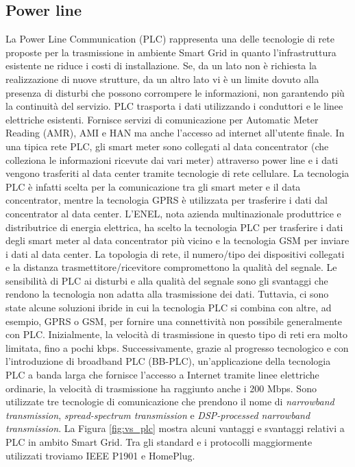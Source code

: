 \subsection{Power line}
La Power Line Communication (PLC) rappresenta una delle tecnologie di rete proposte per la trasmissione in ambiente Smart Grid in quanto l'infrastruttura esistente ne riduce i costi di installazione. Se, da un lato non è richiesta la realizzazione di nuove strutture, da un altro lato vi è un limite dovuto alla presenza di disturbi che possono corrompere le informazioni, non garantendo più la continuità del servizio. PLC trasporta i dati utilizzando i conduttori e le linee elettriche esistenti. Fornisce servizi di comunicazione per Automatic Meter Reading (AMR), AMI e HAN ma anche l'accesso ad internet all'utente finale. In una tipica rete PLC, gli smart meter sono collegati al data concentrator (che colleziona le informazioni ricevute dai vari meter) attraverso power line e i dati vengono trasferiti al data center tramite tecnologie di rete cellulare. La tecnologia PLC è infatti scelta per la comunicazione tra gli smart meter e il data concentrator, mentre la tecnologia GPRS è utilizzata per trasferire i dati dal concentrator al data center.\newline\newline
L'ENEL, nota azienda multinazionale produttrice e distributrice di energia elettrica, ha scelto la tecnologia PLC per trasferire i dati degli smart meter al data concentrator più vicino e la tecnologia GSM per inviare i dati al data center.
La topologia di rete, il numero/tipo dei dispositivi collegati e la distanza trasmettitore/ricevitore compromettono la qualità del segnale.
\newpage
Le sensibilità di PLC ai disturbi e alla qualità del segnale sono gli svantaggi che rendono la tecnologia non adatta alla trasmissione dei dati. Tuttavia, ci sono state alcune soluzioni ibride in cui la tecnologia PLC si combina con altre, ad esempio, GPRS o GSM, per fornire una connettività non possibile generalmente con PLC.\newline\newline
Inizialmente, la velocità di trasmissione in questo tipo di reti era molto limitata, fino a pochi kbps. Successivamente, grazie al progresso tecnologico e con l'introduzione di broadband PLC (BB-PLC), un'applicazione della tecnologia PLC a banda larga che fornisce l'accesso a Internet tramite linee elettriche ordinarie, la velocità di trasmissione ha raggiunto anche i 200 Mbps. Sono utilizzate tre tecnologie di comunicazione che prendono il nome di \emph{narrowband transmission}, \emph{spread-spectrum transmission} e \emph{DSP-processed narrowband transmission}. La Figura \ref{fig:vs_plc} mostra alcuni vantaggi e svantaggi relativi a PLC in ambito Smart Grid. Tra gli standard e i protocolli maggiormente utilizzati troviamo IEEE P1901 e HomePlug.\vspace{20pt}
